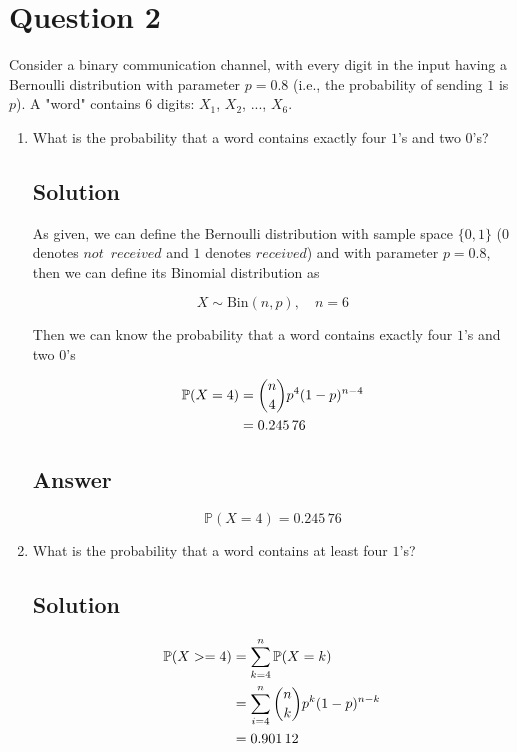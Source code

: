 \documentclass[12pt]{article}
\newcommand{\bP}{\mathbb{P}}
\begin{document}
	
	\section*{Question 2}
	
	\noindent Consider a binary communication channel, with every digit in the input having a Bernoulli distribution with parameter $p = 0.8$ (i.e., the probability of sending $1$ is $p$). A "word" contains 6 digits: $X_1$, $X_2$, ..., $X_6$.
	
	\bigskip
	
	\begin{enumerate}[start=1,label={\bfseries Part \arabic*:},leftmargin=0in]
		\bigskip\item What is the probability that a word contains exactly four $1$'s and two $0$'s?
		
		\subsection*{Solution}
		
			As given, we can define the Bernoulli distribution with sample space $\{0,1\}$ ($0$ denotes $not\enspace received$ and $1$ denotes $received$) and with parameter $p = 0.8$, then we can define its Binomial distribution as
			
			\[X\sim \text{Bin}(n,p),\quad n = 6\]
			
			Then we can know the probability that a word contains exactly four $1$'s and two $0$'s
			
			\[
			\begin{aligned}
				\bP(X = 4) &= \dbinom{n}{4}p^4(1-p)^{n-4}\\
				&= 0.245\,76
			\end{aligned}
			\]
		
		\subsection*{Answer}
		
			\[\boxed{\bP(X = 4) = 0.245\,76}\]
		
		\bigskip\item What is the probability that a word contains at least four $1$'s?
		
		\subsection*{Solution}
		
			\[
			\begin{aligned}
				\bP(X >= 4) &= \sum_{k = 4}^n\bP(X = k)\\
				&= \sum_{i = 4}^n\dbinom{n}{k}p^k(1-p)^{n-k}\\
				&= 0.901\,12
			\end{aligned}
			\]
		

\end{enumerate}
\end{document}

